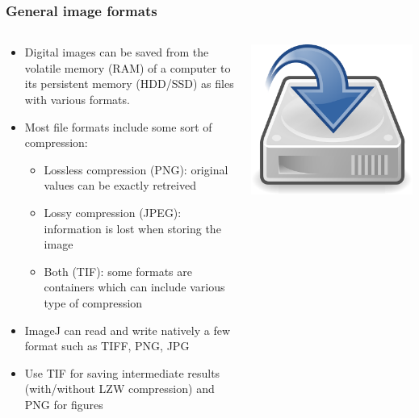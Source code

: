 \documentclass[ignorenonframetext,aspectratio=169,10pt,xcolor=table]{beamer}
\begin{document}
\begin{frame} \frametitle{General image formats}
  \begin{columns}
    \begin{column}{0.75\textwidth}
      \begin{itemize}
      \item Digital images can be saved from the volatile memory (RAM)
        of a computer to its persistent memory (HDD/SSD) as files with various
        formats.
      \item Most file formats include some sort of compression:
        \begin{itemize}
        \item Lossless compression (PNG): original values can be
          exactly retreived
        \item Lossy compression (JPEG): information is lost when
          storing the image
        \item Both (TIF): some formats are containers which can
          include various type of compression
        \end{itemize}
      \item ImageJ can read and write natively a few format such as
        TIFF, PNG, JPG
      \item Use TIF for saving intermediate results (with/without LZW
        compression) and PNG for figures
      \end{itemize}
    \end{column}
    \begin{column}{0.25\textwidth}
      \includegraphics[width=\textwidth]{drive}
    \end{column}
  \end{columns}
\end{frame}
\end{document}
